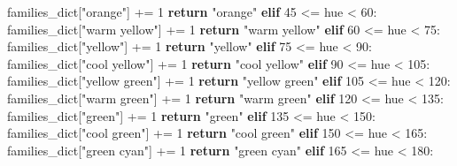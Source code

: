 \documentclass[11pt]{article}
\newenvironment{Shaded}{}{}
\newcommand{\DecValTok}[1]{\textcolor[rgb]{0.25,0.63,0.44}{{#1}}}
\newcommand{\StringTok}[1]{\textcolor[rgb]{0.25,0.44,0.63}{{#1}}}
\newcommand{\NormalTok}[1]{{#1}}
\newcommand{\ControlFlowTok}[1]{\textcolor[rgb]{0.00,0.44,0.13}{\textbf{{#1}}}}
\newcommand{\OperatorTok}[1]{\textcolor[rgb]{0.40,0.40,0.40}{{#1}}}
\begin{document}
\begin{Shaded}
\begin{Highlighting}[]
\NormalTok{            families_dict[}\StringTok{"orange"}\NormalTok{] }\OperatorTok{+=} \DecValTok{1}
            \ControlFlowTok{return} \StringTok{"orange"}
        \ControlFlowTok{elif} \DecValTok{45} \OperatorTok{<=}\NormalTok{ hue }\OperatorTok{<} \DecValTok{60}\NormalTok{:}
\NormalTok{            families_dict[}\StringTok{"warm yellow"}\NormalTok{] }\OperatorTok{+=} \DecValTok{1}
            \ControlFlowTok{return} \StringTok{"warm yellow"}
        \ControlFlowTok{elif} \DecValTok{60} \OperatorTok{<=}\NormalTok{ hue }\OperatorTok{<} \DecValTok{75}\NormalTok{:}
\NormalTok{            families_dict[}\StringTok{"yellow"}\NormalTok{] }\OperatorTok{+=} \DecValTok{1}
            \ControlFlowTok{return} \StringTok{"yellow"}
        \ControlFlowTok{elif} \DecValTok{75} \OperatorTok{<=}\NormalTok{ hue }\OperatorTok{<} \DecValTok{90}\NormalTok{:}
\NormalTok{            families_dict[}\StringTok{"cool yellow"}\NormalTok{] }\OperatorTok{+=} \DecValTok{1}
            \ControlFlowTok{return} \StringTok{"cool yellow"}
        \ControlFlowTok{elif} \DecValTok{90} \OperatorTok{<=}\NormalTok{ hue }\OperatorTok{<} \DecValTok{105}\NormalTok{:}
\NormalTok{            families_dict[}\StringTok{"yellow green"}\NormalTok{] }\OperatorTok{+=} \DecValTok{1}
            \ControlFlowTok{return} \StringTok{"yellow green"}
        \ControlFlowTok{elif} \DecValTok{105} \OperatorTok{<=}\NormalTok{ hue }\OperatorTok{<} \DecValTok{120}\NormalTok{:}
\NormalTok{            families_dict[}\StringTok{"warm green"}\NormalTok{] }\OperatorTok{+=} \DecValTok{1}
            \ControlFlowTok{return} \StringTok{"warm green"}
        \ControlFlowTok{elif} \DecValTok{120} \OperatorTok{<=}\NormalTok{ hue }\OperatorTok{<} \DecValTok{135}\NormalTok{:}
\NormalTok{            families_dict[}\StringTok{"green"}\NormalTok{] }\OperatorTok{+=} \DecValTok{1}
            \ControlFlowTok{return} \StringTok{"green"}
        \ControlFlowTok{elif} \DecValTok{135} \OperatorTok{<=}\NormalTok{ hue }\OperatorTok{<} \DecValTok{150}\NormalTok{:}
\NormalTok{            families_dict[}\StringTok{"cool green"}\NormalTok{] }\OperatorTok{+=} \DecValTok{1}
            \ControlFlowTok{return} \StringTok{"cool green"}
        \ControlFlowTok{elif} \DecValTok{150} \OperatorTok{<=}\NormalTok{ hue }\OperatorTok{<} \DecValTok{165}\NormalTok{:}
\NormalTok{            families_dict[}\StringTok{"green cyan"}\NormalTok{] }\OperatorTok{+=} \DecValTok{1}
            \ControlFlowTok{return} \StringTok{"green cyan"}
        \ControlFlowTok{elif} \DecValTok{165} \OperatorTok{<=}\NormalTok{ hue }\OperatorTok{<} \DecValTok{180}\NormalTok{:}

\end{Highlighting}
\end{Shaded}
\end{document}
